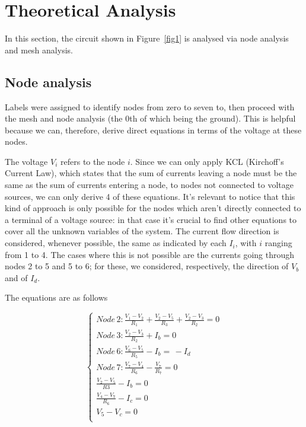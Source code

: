 \section{Theoretical Analysis}
\label{sec:analysis}

In this section, the circuit shown in Figure~\ref{fig1} is analysed via node analysis and mesh analysis.

\subsection{Node analysis}



Labels were assigned to identify nodes from zero to seven to, then proceed with the mesh and node analysis (the 0th of which being the ground). This is helpful because we can, therefore, derive direct equations in terms of the voltage at these nodes.

The voltage $V_i$ refers to the node $i$. Since we can only apply KCL (Kirchoff's Current Law), which states that the sum of currents leaving a node must be the same as the sum of currents entering a node, to nodes not connected to voltage sources, we can only derive 4 of these equations. It's relevant to notice that this kind of approach is only possible for the nodes which aren't directly connected to a terminal of a voltage source: in that case it's crucial to find other equations to cover all the unknown variables of the system.
The current flow direction is considered, whenever possible, the same as indicated by each $I_i$, with $i$ ranging from 1 to 4. The cases where this is not possible are the currents going through nodes 2 to 5 and 5 to 6; for these, we considered, respectively, the direction of $V_b$ and of $I_d$.

The equations are as follows

\begin{equation} 
\begin{cases}  
    Node\, 2: \frac{V_1 - V_2}{R_1} + \frac{V_2 - V_5}{R_3} + \frac{V_2 - V_3}{R_2} = 0 \\
    Node\, 3: \frac{V_2 - V_3}{R_2} + I_b = 0 \\
    Node\, 6: \frac{V_6 - V_5}{R_5} - I_b = \,  - I_d \\
    Node\, 7: \frac{V_7 - V_4}{R_6} - \frac{V_7}{R_7} = 0 \\
    \frac{V_2 - V_5}{R3} - I_b = 0 \\
    \frac{V_4 - V_7}{R_6} - I_c = 0\\
    V_5 - V_c = 0\\
\end{cases}
\label{eq:1}
\end{equation}

